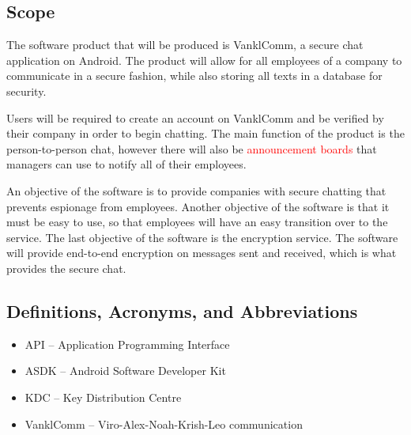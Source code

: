 \documentclass[]{article}
\begin{document}
\subsection{Scope}
\label{sub:scope}
\par The software product that will be produced is VanklComm, a secure chat application on Android. The product will allow for all employees of a company to communicate in a secure fashion, while also storing all texts in a database for security.
\\
\par \noindent Users will be required to create an account on VanklComm and be verified by their company in order to begin chatting. The main function of the product is the person-to-person chat, however there will also be \textcolor{red}{announcement boards} that managers can use to notify all of their employees.
\\
\par \noindent An objective of the software is to provide companies with secure chatting that prevents espionage from employees. Another objective of the software is that it must be easy to use, so that employees will have an easy transition over to the service. The last objective of the software is the encryption service. The software will provide end-to-end encryption on messages sent and received, which is what provides the secure chat.


\subsection{Definitions, Acronyms, and Abbreviations}
\label{sub:definitions_acronyms_and_abbreviations}
\begin{itemize}
	\item API – Application Programming Interface
	\item ASDK – Android Software Developer Kit
	\item KDC – Key Distribution Centre
	\item VanklComm – Viro-Alex-Noah-Krish-Leo communication

\end{itemize}
\end{document}
